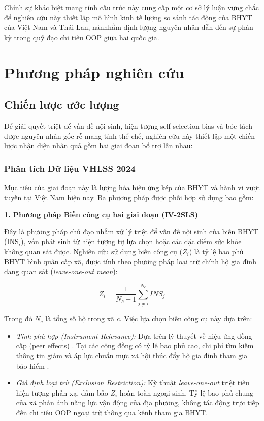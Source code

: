 \documentclass[12pt,a4paper]{article}
\begin{document}
Chính sự khác biệt mang tính cấu trúc này  cung cấp một cơ sở lý luận vững chắc để nghiên cứu này thiết lập mô hình kinh tế lượng so sánh tác động của BHYT của Việt Nam và Thái Lan, nánhhằm định lượng nguyên nhân dẫn đến sự phân kỳ trong quỹ đạo chi tiêu OOP giữa hai quốc gia.

\clearpage
\section{Phương pháp nghiên cứu}
\subsection{Chiến lược ước lượng}

Để giải quyết triệt để vấn đề nội sinh, hiện tượng self-selection bias và bóc tách được nguyên nhân gốc rễ mang tính thể chế, nghiên cứu này thiết lập một chiến lược nhận diện nhân quả gồm hai giai đoạn bổ trợ lẫn nhau:

\subsubsection{Phân tích Dữ liệu VHLSS 2024}
Mục tiêu của giai đoạn này là lượng hóa hiệu ứng kép của BHYT và hành vi vượt tuyến tại Việt Nam hiện nay. Ba phương pháp được phối hợp sử dụng bao gồm:

\textbf{1. Phương pháp Biến công cụ hai giai đoạn (IV-2SLS)}

Đây là phương pháp chủ đạo nhằm xử lý triệt để vấn đề nội sinh của biến BHYT ($\text{INS}_i$), vốn phát sinh từ hiện tượng tự lựa chọn hoặc các đặc điểm sức khỏe không quan sát được. Nghiên cứu sử dụng biến công cụ ($Z_i$) là tỷ lệ bao phủ BHYT bình quân cấp xã, được tính theo phương pháp loại trừ chính hộ gia đình đang quan sát (\textit{leave-one-out mean}):

\begin{equation}
	Z_i = \frac{1}{N_{c}-1} \sum_{j \neq i}^{N_{c}} INS_{j}
\end{equation}

Trong đó $N_c$ là tổng số hộ trong xã $c$. Việc lựa chọn biến công cụ này dựa trên:
\begin{itemize}
	\item \textit{Tính phù hợp (Instrument Relevance):} Dựa trên lý thuyết về hiệu ứng đồng cấp (peer effects) \parencite{manski1993}. Tại các cộng đồng có tỷ lệ bao phủ cao, chi phí tìm kiếm thông tin giảm và áp lực chuẩn mực xã hội thúc đẩy hộ gia đình tham gia bảo hiểm \parencite{wagstaff2007}.
	\item \textit{Giả định loại trừ (Exclusion Restriction):} Kỹ thuật \textit{leave-one-out} triệt tiêu hiện tượng phản xạ, đảm bảo $Z_i$ hoàn toàn ngoại sinh. Tỷ lệ bao phủ chung của xã phản ánh năng lực vận động của địa phương, không tác động trực tiếp đến chi tiêu OOP ngoại trừ thông qua kênh tham gia BHYT.
\end{itemize}
\end{document}
